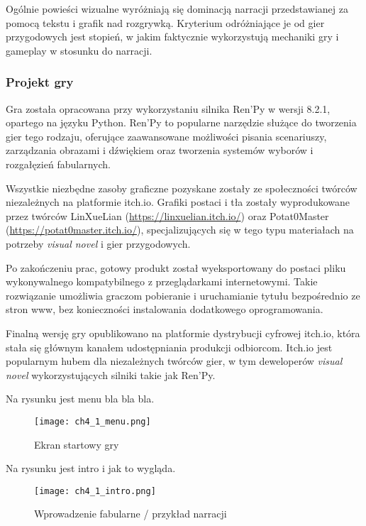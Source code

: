 Ogólnie powieści wizualne wyróżniają się dominacją narracji przedstawianej za pomocą tekstu i grafik nad
rozgrywką. Kryterium odróżniające je od gier przygodowych jest stopień, w jakim faktycznie
wykorzystują mechaniki gry i gameplay w stosunku do narracji\cite{tvtropes_visual_novel}.

\subsubsection*{Projekt gry}

Gra została opracowana przy wykorzystaniu silnika Ren'Py w wersji 8.2.1, opartego na języku Python.
Ren'Py to popularne narzędzie służące do tworzenia gier tego rodzaju, oferujące zaawansowane
możliwości pisania scenariuszy, zarządzania obrazami i dźwiękiem oraz tworzenia systemów wyborów
i rozgałęzień fabularnych.

Wszystkie niezbędne zasoby graficzne pozyskane zostały ze społeczności twórców niezależnych na
platformie itch.io. Grafiki postaci i tła zostały wyprodukowane przez twórców
LinXueLian (\url{https://linxuelian.itch.io/}) oraz Potat0Master (\url{https://potat0master.itch.io/}),
specjalizujących się w tego typu materiałach na potrzeby \textit{visual novel} i gier przygodowych.

Po zakończeniu prac, gotowy produkt został wyeksportowany do postaci pliku wykonywalnego
kompatybilnego z przeglądarkami internetowymi. Takie rozwiązanie umożliwia graczom pobieranie i
uruchamianie tytułu bezpośrednio ze stron www, bez konieczności instalowania dodatkowego
oprogramowania.

Finalną wersję gry opublikowano na platformie dystrybucji cyfrowej itch.io, która stała się
głównym kanałem udostępniania produkcji odbiorcom. Itch.io jest popularnym hubem dla niezależnych
twórców gier, w tym deweloperów \textit{visual novel} wykorzystujących silniki takie jak Ren'Py.

Na rysunku jest menu bla bla bla.

\begin{figure}[h!]
    \centering
    \texttt{[image: ch4\_1\_menu.png]}
    \caption{Ekran startowy gry}
    \label{fig:ch4_1_menu}
\end{figure}

\newpage
Na rysunku jest intro i jak to wygląda.

\begin{figure}[h!]
    \centering
    \texttt{[image: ch4\_1\_intro.png]}
    \caption{Wprowadzenie fabularne / przykład narracji}
    \label{fig:ch4_1_intro}
\end{figure}

